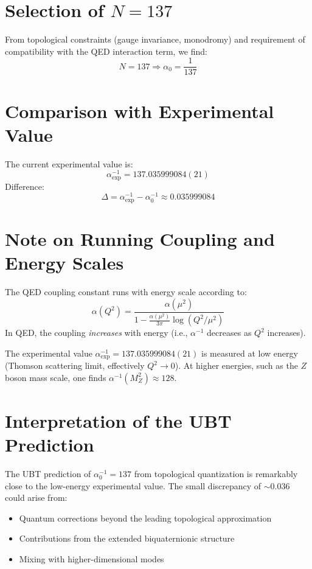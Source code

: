 \documentclass[12pt, a4paper]{article}
\begin{document}
\section{Selection of \( N = 137 \)}

From topological constraints (gauge invariance, monodromy) and requirement of compatibility with the QED interaction term, we find:
\[
N = 137 \Rightarrow \alpha_0 = \frac{1}{137}
\]

\section{Comparison with Experimental Value}

The current experimental value is:
\[
\alpha_{\text{exp}}^{-1} = 137.035999084(21)
\]
Difference:
\[
\Delta = \alpha_{\text{exp}}^{-1} - \alpha_0^{-1} \approx 0.035999084
\]

\section{Note on Running Coupling and Energy Scales}

The QED coupling constant runs with energy scale according to:
\[
\alpha(Q^2) = \frac{\alpha(\mu^2)}{1 - \frac{\alpha(\mu^2)}{3\pi} \log(Q^2/\mu^2)}
\]
In QED, the coupling \emph{increases} with energy (i.e., $\alpha^{-1}$ decreases as $Q^2$ increases).

The experimental value $\alpha_{\text{exp}}^{-1} = 137.035999084(21)$ is measured at low energy (Thomson scattering limit, effectively $Q^2 \to 0$). At higher energies, such as the $Z$ boson mass scale, one finds $\alpha^{-1}(M_Z^2) \approx 128$.

\section{Interpretation of the UBT Prediction}

The UBT prediction of $\alpha_0^{-1} = 137$ from topological quantization is remarkably close to the low-energy experimental value. The small discrepancy of $\sim 0.036$ could arise from:
\begin{itemize}
\item Quantum corrections beyond the leading topological approximation
\item Contributions from the extended biquaternionic structure
\item Mixing with higher-dimensional modes
\end{itemize}
\end{document}
